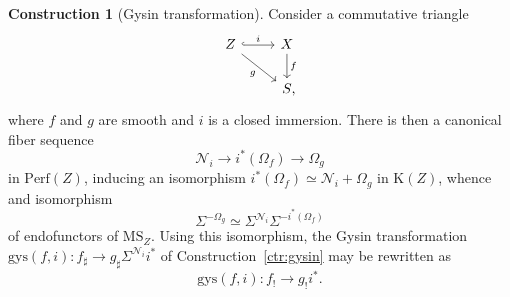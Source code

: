 \documentclass{amsart}
\numberwithin{equation}{section}
\theoremstyle{plain}
\theoremstyle{definition}
\newtheorem{construction}[equation]{Construction}
\let\scr=\mathcal
\def\K{\mathrm{K}{}}
\def\MS{\mathrm{MS}}
\def\Perf{\mathrm{Perf}{}}
\begin{document}
\begin{construction}[Gysin transformation]
\label{ctr:gysin!}
Consider a commutative triangle
\[
\begin{tikzcd}
	Z \ar[hook]{r}{i} \ar{dr}[swap]{g} & X \ar{d}{f} \\
	& S\rlap,
\end{tikzcd}
\]
where $f$ and $g$ are smooth and $i$ is a closed immersion. There is then a canonical fiber sequence
\[
\scr N_i\to i^*(\Omega_f) \to \Omega_g
\]
in $\Perf(Z)$, inducing an isomorphism $i^*(\Omega_f)\simeq \scr N_i+\Omega_g$ in $\K(Z)$, whence and isomorphism
\[
\Sigma^{-\Omega_g} \simeq \Sigma^{\scr N_i}\Sigma^{-i^*(\Omega_f)}
\]
of endofunctors of $\MS_Z$. 
Using this isomorphism, the Gysin transformation $\mathrm{gys}(f,i)\colon f_\sharp\to g_\sharp \Sigma^{\scr N_i}i^*$ of Construction~\ref{ctr:gysin} may be rewritten as
\[
\mathrm{gys}(f,i)\colon f_! \to g_!i^*.
\]
\end{construction}
\end{document}
